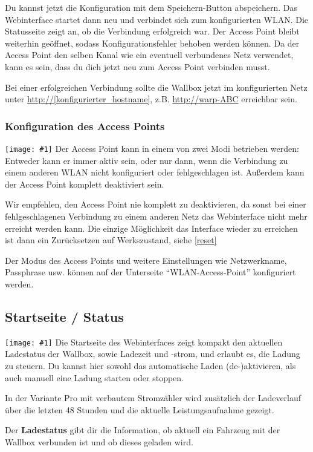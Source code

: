 \documentclass[a4paper,10pt]{article}
\newcommand{\hint}[1]{\begin{tcolorbox}[colback=boxgray,colframe=black,coltext=
white,title=Hinweis]#1\end{tcolorbox}}
\newcommand{\gfx}[1]{\texttt{[image: \#1]}}
\begin{document}
\begin{multicols*}{2}
	Du kannst jetzt die Konfiguration mit dem Speichern-Button abspeichern.
	Das Webinterface startet dann neu und verbindet sich zum konfigurierten WLAN. Die Statusseite zeigt
	an, ob die Verbindung erfolgreich war. Der Access Point bleibt weiterhin
	geöffnet, sodass Konfigurationsfehler behoben werden können.
	Da der Access Point den selben Kanal wie ein eventuell verbundenes Netz verwendet,
	kann es sein, dass du dich jetzt neu zum Access Point verbinden musst.

	Bei einer erfolgreichen Verbindung sollte die Wallbox jetzt im konfigurierten Netz unter
	\url{http://[konfigurierter_hostname]}, z.B. \url{http://warp-ABC} erreichbar sein.

	\subsubsection{Konfiguration des Access Points}
	\gfx{./img/resized/web_wifi_ap}
	Der Access Point kann in einem von zwei Modi betrieben werden: Entweder kann er immer aktiv sein,
	oder nur dann, wenn die Verbindung zu einem anderen WLAN nicht konfiguriert oder fehlgeschlagen ist.
	Außerdem kann der Access Point komplett deaktiviert sein.
	\hint{Wir empfehlen, den Access Point nie komplett zu deaktivieren, da sonst bei einer
		fehlgeschlagenen Verbindung zu einem anderen Netz das Webinterface nicht mehr erreicht
		werden kann. Die einzige Möglichkeit das Interface wieder zu erreichen ist dann ein Zurücksetzen auf Werkszustand, siehe \ref{reset}}
	Der Modus des Access Points und weitere Einstellungen wie Netzwerkname, Passphrase usw. können
	auf der Unterseite \enquote{WLAN-Access-Point} konfiguriert werden.

	\subsection{Startseite / Status}
	\gfx{./img/resized/web_status}
	Die Startseite des Webinterfaces zeigt kompakt den aktuellen Ladestatus der
	Wallbox, sowie Ladezeit und -strom, und erlaubt es, die Ladung zu steuern.
	Du kannst hier sowohl das automatische Laden (de-)aktivieren, als auch
	manuell eine Ladung starten oder stoppen.

	In der Variante Pro mit verbautem Stromzähler wird zusätzlich der Ladeverlauf
	über die letzten 48 Stunden und die aktuelle Leistungsaufnahme gezeigt.

	Der \textbf{Ladestatus} gibt dir die Information, ob aktuell ein
	Fahrzeug mit der Wallbox verbunden ist und ob dieses geladen wird.


\end{multicols*}
\end{document}
